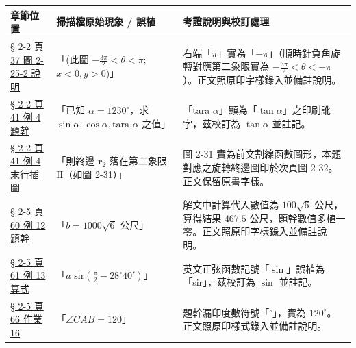 \documentclass[a4paper,12pt,twoside]{article}
\begin{document}
\begin{table}[H]
\centering
\small
\renewcommand{\arraystretch}{1.35}
\begin{tabularx}{\textwidth}{|p{3.2cm}|p{3.8cm}|X|}
\hline
\textbf{章節位置} & \textbf{掃描檔原始現象 / 誤植} & \textbf{考證說明與校訂處理} \\ \hline

\hyperref[note:b3-ch2-p37-fig2-25-2]{§ 2-2 頁 37 圖 2-25-2 說明} & 
「(此圖 $-\frac{3\pi}{2} < \theta < \pi$; $x<0, y>0$)」 & 
右端「$\pi$」實為「$-\pi$」（順時針負角旋轉對應第二象限實為 $-\frac{3\pi}{2} < \theta < -\pi$）。正文照原印字樣錄入並備註說明。 \\ \hline

\hyperref[note:b3-ch2-p41-ex4-typo]{§ 2-2 頁 41 例 4 題幹} & 
「已知 $\alpha = 1230^\circ$，求 $\sin\alpha, \cos\alpha, \text{tara }\alpha$ 之值」 & 
「tara $\alpha$」顯為「$\tan\alpha$」之印刷訛字，茲校訂為 $\tan\alpha$ 並註記。 \\ \hline

\hyperref[note:b3-ch2-p41-ref-fig31]{§ 2-2 頁 41 例 4 末行插圖} & 
「則終邊 $\mathbf{r}_2$ 落在第二象限 $\mathrm{II}$（如圖 2-31）」 & 
圖 2-31 實為前文割線函數圖形，本題對應之旋轉終邊圖印於次頁圖 2-32。正文保留原書字樣。 \\ \hline

\hyperref[note:b3-ch2-p60-ex12-data]{§ 2-5 頁 60 例 12 題幹} & 
「$b = 1000\sqrt{6}$ 公尺」 & 
解文中計算代入數值為 $100\sqrt{6}$ 公尺，算得結果 $467.5$ 公尺，題幹數值多植一零。正文照原印字樣錄入並備註說明。 \\ \hline

\hyperref[note:b3-ch2-p61-ex13-sir]{§ 2-5 頁 61 例 13 算式} & 
「$a\text{ sir}(\frac{\pi}{2} - 28^\circ 40')$」 & 
英文正弦函數記號「$\sin$」誤植為「sir」，茲校訂為 $\sin$ 並註記。 \\ \hline

\hyperref[note:b3-ch2-p66-homework16-deg]{§ 2-5 頁 66 作業 16} & 
「$\angle CAB = 120$」 & 
題幹漏印度數符號「$^\circ$」，實為 $120^\circ$。正文照原印樣式錄入並備註說明。 \\ \hline

\end{tabularx}
\end{table}

\clearpage
\tableofcontents
\newpage

\setcounter{section}{1}

\end{document}
